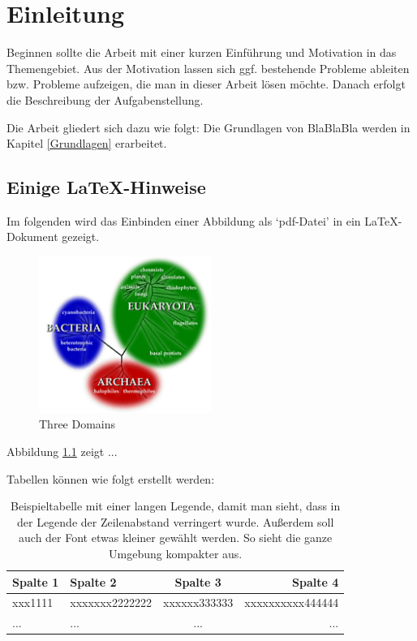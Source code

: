 
\chapter{Einleitung}\label{Einleitung}

Beginnen sollte die Arbeit mit einer kurzen Einführung und Motivation in das Themengebiet. Aus der Motivation lassen sich ggf. bestehende Probleme ableiten bzw. Probleme aufzeigen, die man in dieser Arbeit lösen möchte. Danach erfolgt die Beschreibung der Aufgabenstellung.

Die Arbeit gliedert sich dazu wie folgt: Die Grundlagen von BlaBlaBla 
werden in Kapitel \ref{Grundlagen} erarbeitet. 

\section*{Einige LaTeX-Hinweise}

Im folgenden wird das Einbinden einer Abbildung als `pdf-Datei' in ein
\LaTeX-Dokument gezeigt.

\begin{figure}[htb]
  \centering
  \includegraphics[width=0.5\textwidth]{figures/threedomains.pdf}
  \caption{Three Domains}
  \label{fig2_1}
\end{figure}

Abbildung \ref{fig2_1} zeigt ...

Tabellen können wie folgt erstellt werden:

\begin{table}[htb]
  \centering
  \begin{tabular}{|p{2.7cm}||l|c|r|}
    \hline
    \textbf{Spalte 1} 
    & \textbf{Spalte 2} 
    & \textbf{Spalte 3} 
    & \textbf{Spalte 4} \\
    \hline\hline
    xxx1111
    & xxxxxxx2222222
    & xxxxxx333333 
    & xxxxxxxxxx444444 \\
    \hline
    ...
    & ...
    & ...
    & ...\\
    \hline
  \end{tabular}
  \caption[Beispieltabelle mit langer Legende]{Beispieltabelle mit einer langen Legende, damit man sieht, dass in der Legende der Zeilenabstand verringert wurde. Außerdem soll auch der Font etwas kleiner gewählt werden. So sieht die ganze Umgebung kompakter aus.}
  \label{tabelle-1}
\end{table}


